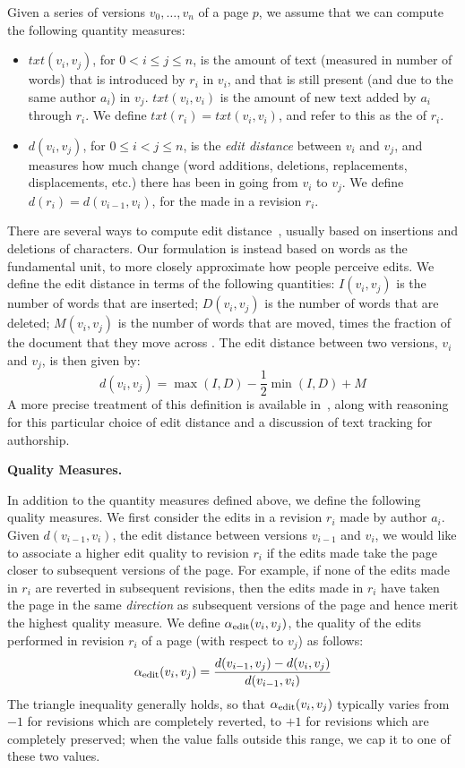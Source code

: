 Given a series of versions $v_0,\ldots,v_n$ of a page $p$, we assume
that we can compute the following quantity measures:
%
\begin{itemize}

\item $txt(v_i, v_j)$, for $0 < i \le j \le n$, is the amount of
	text (measured in number of words) that is introduced by
	$r_i$ in $v_i$, and that is still present (and due to the same
	author $a_i$) in $v_j$.
	$txt(v_i,v_i)$ is the amount of new text added by $a_i$ through
	$r_i$.
	We define $txt(r_i) = txt(v_i,v_i)$, and refer to this
	as the  of $r_i$.

\item $d(v_i, v_j)$, for $0 \le i < j \le n$, is the
	\textit{edit distance} between $v_i$ and $v_j$,
	and measures how much change
	(word additions, deletions, replacements, displacements, etc.)
	there has been in going from $v_i$ to $v_j$.
	We define $d(r_i) = d(v_{i-1}, v_i)$, for the 
	made in a revision $r_i$.
\end{itemize}
%
There are several ways to compute edit distance~\cite{Levenshtein66,TichyEditDist},
usually based on insertions and deletions of characters.
Our formulation is instead based on words as the fundamental unit,
to more closely approximate how people perceive edits.
We define the edit distance in terms of the following quantities:
$I(v_i, v_j)$ is the number of words that are inserted;
$D(v_i, v_j)$ is the number of words that are deleted;
$M(v_i, v_j)$ is the number of words that are moved, times the fraction
of the document that they move across \cite{www07}.
The edit distance between two versions, $v_i$ and $v_j$, is
then given by:
%
\[
d(v_i, v_j) = \max(I, D) - \frac{1}{2}\min(I, D) + M
\]
%
A more precise treatment of this definition is available
in~\cite{www07}, along with reasoning for this particular
choice of edit distance and a discussion of text tracking
for authorship.


\smallskip

\noindent\textbf{Quality Measures.}

In addition to the quantity measures defined above, we define the
following quality measures.
We first consider the edits in a revision $r_i$ made by author
$a_i$.
Given $d(v_{i-1}, v_i)$, the edit distance between versions
$v_{i-1}$ and $v_i$, we would like to associate a higher edit
quality to revision $r_i$ if the edits made take the page
closer to subsequent versions of the page.
For example, if none of the edits made in $r_i$ are reverted
in subsequent revisions, then the edits made in $r_i$
have taken the page in the same {\em direction\/} as subsequent 
versions of the page and hence merit the highest quality measure.
We define $\alpha_\text{edit}(v_i, v_j)$, the quality of the edits
performed in revision $r_i$ of a page (with respect to $v_j$) as follows:
%
\[
\alpha_\text{edit}(v_i, v_j) = 
\frac{d(v_{i-1}, v_j) - d(v_i, v_j)}{d(v_{i-1}, v_i)}
\]
%
The triangle inequality generally holds, so that
$\alpha_\text{edit}(v_i, v_j)$ typically varies from
$-1$ for revisions which are completely reverted,
to $+1$ for revisions which are completely preserved;
when the value falls outside this range, we
cap it to one of these two values.

